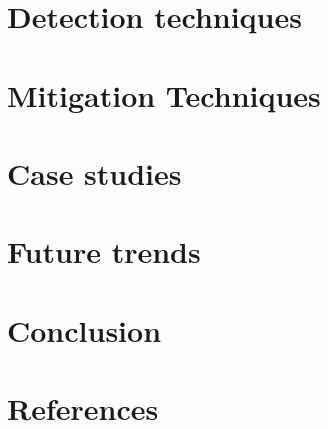 \documentclass{article}
\begin{document}
\section{Detection techniques}%


\section{Mitigation Techniques}%


\section{Case studies}%


\section{Future trends}%


\section{Conclusion}%


\section{References}%
\end{document}
